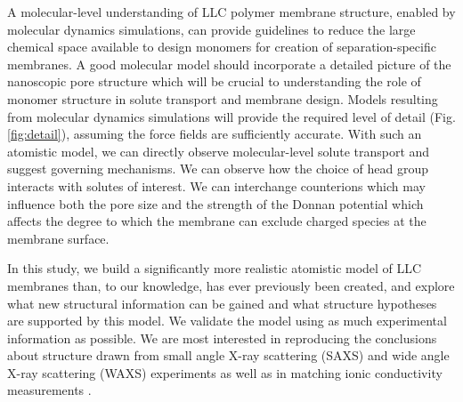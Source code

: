 \documentclass[journal=jpcbfk,manusciprt=article]{achemso}
\begin{document}
  A molecular-level understanding of LLC polymer membrane structure, enabled by
  molecular dynamics simulations, can provide guidelines to reduce the large
  chemical space available to design monomers for creation of separation-specific
  membranes. A good molecular model should incorporate a detailed picture of the
  nanoscopic pore structure which will be crucial to understanding the role of
  monomer structure in solute transport and membrane design. Models resulting
  from molecular dynamics simulations will provide the required level of detail
  (Fig. \ref{fig:detail}), assuming the force fields are sufficiently accurate.
  With such an atomistic model, we can directly observe molecular-level solute
  transport and suggest governing mechanisms. We can observe how the choice of
  head group interacts with solutes of interest. We can interchange
  counterions which may influence both the pore size and the strength of the
  Donnan potential which affects the degree to which the membrane can exclude
  charged species at the membrane surface. 

  In this study, we build a significantly more realistic atomistic model of LLC
  membranes than, to our knowledge, has ever previously been created, and explore
  what new structural information can be gained and what structure hypotheses are
  supported by this model. We validate the model using as much experimental
  information as possible. We are most interested in reproducing the conclusions
  about structure drawn from small angle X-ray scattering (SAXS)
  and wide angle X-ray scattering (WAXS) experiments as well as in matching ionic
  conductivity measurements \cite{feng_thin_2016}.
\end{document}
